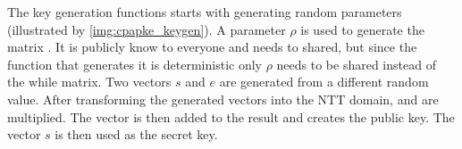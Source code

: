 \noindent The key generation functions starts with generating random parameters (illustrated by \ref{img:cpapke_keygen}). A parameter $\rho$ is used to generate the matrix . It is publicly know to everyone and needs to shared, but since the function that generates it is deterministic only $\rho$ needs to be shared instead of the while matrix. Two vectors $s$ and $e$ are generated from a different random value. After transforming the generated vectors into the NTT domain,  and  are multiplied. The vector  is then added to the result and creates the public key. The vector $s$ is then used as the secret key.
